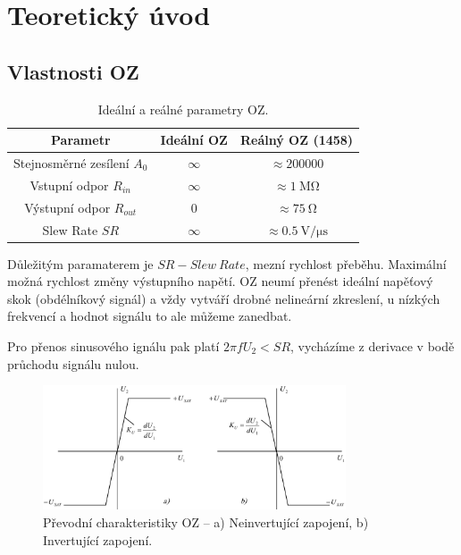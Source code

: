 \documentclass{protokol}
\begin{document}
	\maketitle
	
	\section{Teoretický úvod}
	
	\subsection{Vlastnosti OZ}
	
	\begin{table}[h!]
		\centering
		\def\arraystretch{1.4}
		\centering
		\begin{tabular}{|c|c|c|}	
			\hline
			Parametr & Ideální OZ & Reálný OZ (1458)\\ [0.1ex]
			\hline
			Stejnosměrné zesílení $ A_0 $ & $ \infty $ & $ \approx \num{200000}$\\ [0.1ex]
			\hline
			Vstupní odpor $ R_{in} $ & $\infty$ & $ \approx \SI{1}{\mega\ohm} $\\ [0.1ex]
			\hline
			Výstupní odpor $ R_{out} $ & 0 & $ \approx \SI{75}{\ohm} $\\ [0.1ex]
			\hline
			Slew Rate $ SR $ & $ \infty $ & $ \approx \SI{0.5}{\volt\per\micro\second} $\\ [0.1ex]
			\hline

		\end{tabular}
		\caption{Ideální a reálné parametry OZ.}
		\label{tab:porovnani}
	\end{table}

Důležitým paramaterem je $SR - Slew\ Rate $, mezní rychlost přeběhu. Maximální možná rychlost změny výstupního napětí. OZ neumí přenést ideální napěťový skok (obdélníkový signál) a vždy vytváří drobné nelineární zkreslení, u nízkých frekvencí a hodnot signálu to ale můžeme zanedbat.

Pro přenos sinusového ignálu pak platí $ 2\pi f U_2 < SR $, vycházíme z derivace v bodě průchodu signálu nulou.

\begin{figure}[h!]
	\centering
	\includegraphics[width=0.8\textwidth]{prevodni.png}
	\centering
	\caption{Převodní charakteristiky OZ -- a) Neinvertující zapojení, b) Invertující zapojení.}
	\label{fig:prevodni}
\end{figure}
\end{document}
